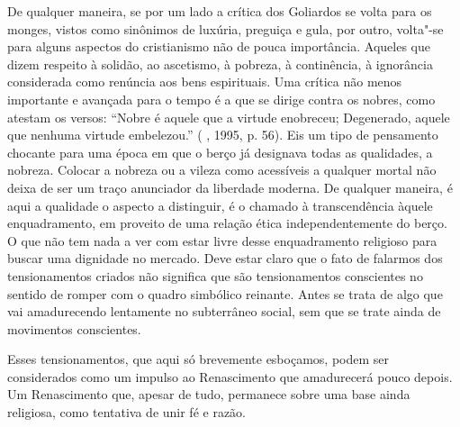 De qualquer maneira, se por um lado a crítica dos Goliardos se volta
para os monges, vistos como sinônimos de luxúria, preguiça e gula, por
outro, volta"-se para alguns aspectos do cristianismo não de pouca
importância. Aqueles que dizem respeito à solidão, ao ascetismo, à
pobreza, à continência, à ignorância considerada como renúncia aos bens
espirituais. Uma crítica não menos importante e avançada para o tempo é
a que se dirige contra os nobres, como atestam os versos: ``Nobre é
aquele que a virtude enobreceu; Degenerado, aquele que nenhuma virtude
embelezou.'' ( , 1995, p. 56). Eis um tipo de pensamento
chocante para uma época em que o berço já designava todas as qualidades,
a nobreza. Colocar a nobreza ou a vileza como acessíveis a qualquer
mortal não deixa de ser um traço anunciador da liberdade moderna. De
qualquer maneira, é aqui a qualidade o aspecto a distinguir, é o chamado
à transcendência àquele enquadramento, em proveito de uma relação ética
independentemente do berço. O que não tem nada a ver com estar livre
desse enquadramento religioso para buscar uma dignidade no mercado. Deve
estar claro que o fato de falarmos dos tensionamentos criados não
significa que são tensionamentos conscientes no sentido de romper com o
quadro simbólico reinante. Antes se trata de algo que vai amadurecendo
lentamente no subterrâneo social, sem que se trate ainda de movimentos
conscientes.

Esses tensionamentos, que aqui só brevemente esboçamos, podem ser
considerados como um impulso ao Renascimento que amadurecerá pouco
depois. Um Renascimento que, apesar de tudo, permanece sobre uma base
ainda religiosa, como tentativa de unir fé e razão.

